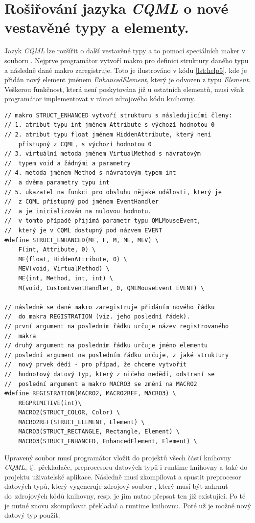 \documentclass[11pt,twoside,a4paper]{book}
\begin{document}
\chapter[Rozšiřování \textit{CQML}]{\label{CH:APD}Rošiřování jazyka \textit{CQML} o nové vestavěné typy a elementy.}
Jazyk \textit{CQML} lze rozšířit o další vestavěné typy a to pomocí speciálních maker v souboru . Nejprve programátor vytvoří makro pro definici struktury daného typu a následně dané makro zaregistruje. Toto je ilustrováno v kódu \ref{lst:help5}, kde je přidán nový element jménem \textit{EnhancedElement}, který je odvozen z typu \textit{Element}. Veškerou funkčnost, která není poskytována již u ostatních elementů, musí však programátor implementovat v rámci zdrojového kódu knihovny.\\
\begin{lstlisting}[float, frame=single,caption=Registrace nového vestavěného datového typu.,label=lst:help5]
// makro STRUCT_ENHANCED vytvoří strukturu s následujicími členy:
// 1. atribut typu int jménem Attribute s výchozí hodnotou 0
// 2. atribut typu float jménem HiddenAttribute, který není 
	přístupný z CQML, s výchozí hodnotou 0
// 3. virtuální metoda jménem VirtualMethod s návratovým 
//	typem void a žádnými a parametry
// 4. metoda jménem Method s návratovým typem int 
//	a dvěma parametry typu int
// 5. ukazatel na funkci pro obsluhu nějaké události, který je
//	z CQML přístupný pod jménem EventHandler
//	a je inicializován na nulovou hodnotu. 
//	v tomto případě přijímá parametr typu QMLMouseEvent, 
//	který je v CQML dostupný pod názvem EVENT
#define STRUCT_ENHANCED(MF, F, M, ME, MEV) \
	F(int, Attribute, 0) \
	MF(float, HiddenAttribute, 0) \
	MEV(void, VirtualMethod) \
	ME(int, Method, int, int) \
	M(void, CustomEventHandler, 0, QMLMouseEvent EVENT) \

// následně se dané makro zaregistruje přidáním nového řádku 
// 	do makra REGISTRATION (viz. jeho poslední řádek).
// první argument na posledním řádku určuje název registrovaného
//	makra
// druhý argument na posledním řádku určuje jméno elementu
// poslední argument na posledním řádku určuje, z jaké struktury
//	nový prvek dědí - pro případ, že chceme vytvořit
//	hodnotový datový typ, který z ničeho nedědí, odstraní se 
//	poslední argument a makro MACRO3 se změní na MACRO2
#define REGISTRATION(MACRO2, MACRO2REF, MACRO3) \
	REGPRIMITIVE(int)\
	MACRO2(STRUCT_COLOR, Color) \
	MACRO2REF(STRUCT_ELEMENT, Element) \
	MACRO3(STRUCT_RECTANGLE, Rectangle, Element) \
	MACRO3(STRUCT_ENHANCED, EnhancedElement, Element) \ 
\end{lstlisting}
Upravený soubor \uv{struct\_definition\_macros.h} musí programátor vložit do projektů všech částí knihovny \textit{CQML}, tj. překladače, preprocesoru datových typů i runtime knihovny a také do projektu uživatelské aplikace. Následně musí zkompilovat a spustit preprocesor datových typů, který vygeneruje zdrojový soubor , který musí být zahrnut do~zdrojových kódů knihovny, resp. je jím nutno přepsat ten již existující. Po té je nutné znovu zkompilovat překladač a runtime knihovnu. Poté už je možné nový datový typ použít.
\end{document}
